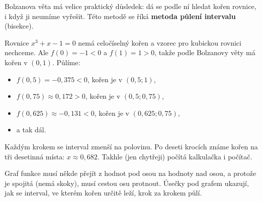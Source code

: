 Bolzanova věta má velice praktický důsledek: dá se podle ní hledat kořen rovnice, i když ji neumíme vyřešit. Této metodě se říká \textbf{metoda půlení intervalu} (bisekce).

\begin{example}\label{ex:puleni-intervalu}
  Rovnice $x^3 + x - 1 = 0$ nemá celočíselný kořen a vzorec pro kubickou rovnici nechceme. Ale $f(0) = -1 < 0$ a $f(1) = 1 > 0$, takže podle Bolzanovy věty má kořen v $(0, 1)$. Půlíme:
  \begin{itemize}
    \item $f(0{,}5) = -0{,}375 < 0$, kořen je v $(0{,}5; 1)$,
    \item $f(0{,}75)\approx 0{,}172 > 0$, kořen je v $(0{,}5; 0{,}75)$,
    \item $f(0{,}625)\approx -0{,}131 < 0$, kořen je v $(0{,}625; 0{,}75)$,
    \item a tak dál.
  \end{itemize}
  Každým krokem se interval zmenší na polovinu. Po deseti krocích známe kořen na tři desetinná místa: $x\approx 0{,}682$. Takhle (jen chytřeji) počítá kalkulačka i počítač.

  \begin{center}
  \end{center}
  Graf funkce musí někde přejít z hodnot pod osou na hodnoty nad osou, a protože je spojitá (nemá skoky), musí cestou osu protnout. Úsečky pod grafem ukazují, jak se interval, ve kterém kořen určitě leží, krok za krokem půlí.
\end{example}


